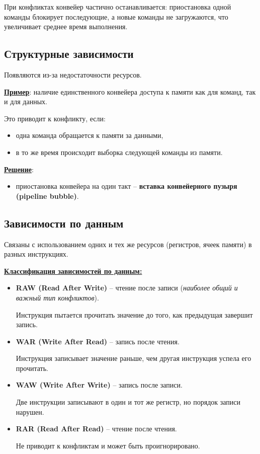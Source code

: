 	При конфликтах конвейер частично останавливается: приостановка одной команды блокирует последующие, а новые команды не загружаются, что увеличивает среднее время выполнения.
	
	\newpage
	
	\subsection{Структурные зависимости}
	
	Появляются из-за недостаточности ресурсов. 
	\par 
	\textbf{\uline{Пример}}: наличие единственного конвейера доступа к памяти как для команд, так и для данных. 
	\par
	Это приводит к конфликту, если:
	\vspace{-0.35em}
	\begin{itemize}
		\item одна команда обращается к памяти за данными,
		\item в то же время происходит выборка следующей команды из памяти.
	\end{itemize}
	\vspace{-0.5em}
	\textbf{\uline{Решение}}:
	\vspace{-0.35em}
	\begin{itemize}
		\item приостановка конвейера на один такт -- \textbf{вставка конвейерного пузыря (pipeline bubble)}.
	\end{itemize}
	\vspace{-1.5em}
	\subsection{Зависимости по данным}
	
	Связаны с использованием одних и тех же ресурсов (регистров, ячеек памяти) в разных инструкциях.
	
	\textbf{\uline{Классификация зависимостей по данным:}}
	
	\begin{itemize}
		\item \textbf{RAW (Read After Write)} – чтение после записи (\textit{наиболее общий и важный тип конфликтов}). 
		\par
		Инструкция пытается прочитать значение до того, как предыдущая завершит запись. 
		\par
		\item \textbf{WAR (Write After Read)} – запись после чтения. 
		\par
		Инструкция записывает значение раньше, чем другая инструкция успела его прочитать.
		\item \textbf{WAW (Write After Write)} – запись после записи. 
		\par
		Две инструкции записывают в один и тот же регистр, но порядок записи нарушен.
		\item \textbf{RAR (Read After Read)} – чтение после чтения. 
		\par
		Не приводит к конфликтам и может быть проигнорировано.
	\end{itemize}
	
